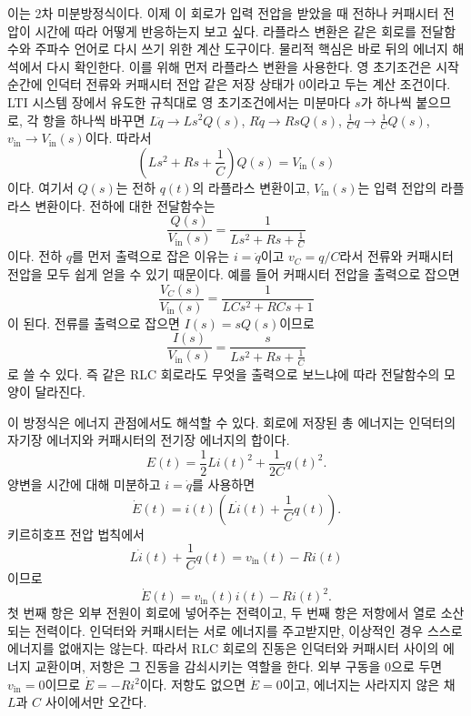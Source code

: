 이는 2차 미분방정식이다.
이제 이 회로가 입력 전압을 받았을 때 전하나 커패시터 전압이 시간에 따라 어떻게 반응하는지 보고 싶다.
라플라스 변환은 같은 회로를 전달함수와 주파수 언어로 다시 쓰기 위한 계산 도구이다.
물리적 핵심은 바로 뒤의 에너지 해석에서 다시 확인한다.
이를 위해 먼저 라플라스 변환을 사용한다.
영 초기조건은 시작 순간에 인덕터 전류와 커패시터 전압 같은 저장 상태가 0이라고 두는 계산 조건이다.
LTI 시스템 장에서 유도한 규칙대로 영 초기조건에서는 미분마다 $s$가 하나씩 붙으므로, 각 항을 하나씩 바꾸면 $L\ddot{q}\to Ls^2Q(s)$, $R\dot{q}\to RsQ(s)$, $\frac{1}{C}q\to\frac{1}{C}Q(s)$, $v_{\mathrm{in}}\to V_{\mathrm{in}}(s)$이다.
%
따라서
\begin{equation}
  \left(Ls^2 + Rs + \frac{1}{C}\right) Q(s) = V_{\mathrm{in}}(s)
\end{equation}
이다.
여기서 $Q(s)$는 전하 $q(t)$의 라플라스 변환이고, $V_{\mathrm{in}}(s)$는 입력 전압의 라플라스 변환이다.
전하에 대한 전달함수는
\begin{equation}
  \frac{Q(s)}{V_{\mathrm{in}}(s)}
  =
  \frac{1}{Ls^2 + Rs + \frac{1}{C}}
\end{equation}
이다.
전하 $q$를 먼저 출력으로 잡은 이유는 $i=\dot{q}$이고 $v_C=q/C$라서 전류와 커패시터 전압을 모두 쉽게 얻을 수 있기 때문이다.
예를 들어 커패시터 전압을 출력으로 잡으면
\begin{equation}
  \frac{V_C(s)}{V_{\mathrm{in}}(s)}
  =
  \frac{1}{LCs^2+RCs+1}
\end{equation}
이 된다.
전류를 출력으로 잡으면 $I(s)=sQ(s)$이므로
\begin{equation}
  \frac{I(s)}{V_{\mathrm{in}}(s)}
  =
  \frac{s}{Ls^2+Rs+\frac{1}{C}}
\end{equation}
로 쓸 수 있다.
즉 같은 RLC 회로라도 무엇을 출력으로 보느냐에 따라 전달함수의 모양이 달라진다.

이 방정식은 에너지 관점에서도 해석할 수 있다.
회로에 저장된 총 에너지는 인덕터의 자기장 에너지와 커패시터의 전기장 에너지의 합이다.
\begin{equation}
  E(t)
  =
  \frac{1}{2}L i(t)^2
  +
  \frac{1}{2C}q(t)^2.
\end{equation}
양변을 시간에 대해 미분하고 $i=\dot{q}$를 사용하면
\begin{equation}
  \dot{E}(t)
  =
  i(t)
  \left(
  L\dot{i}(t)+\frac{1}{C}q(t)
  \right).
\end{equation}
키르히호프 전압 법칙에서
\begin{equation}
  L\dot{i}(t)+\frac{1}{C}q(t)
  =
  v_{\mathrm{in}}(t)-Ri(t)
\end{equation}
이므로
\begin{equation}
  \dot{E}(t)
  =
  v_{\mathrm{in}}(t)i(t) - R i(t)^2.
\end{equation}
첫 번째 항은 외부 전원이 회로에 넣어주는 전력이고, 두 번째 항은 저항에서 열로 소산되는 전력이다.
인덕터와 커패시터는 서로 에너지를 주고받지만, 이상적인 경우 스스로 에너지를 없애지는 않는다.
따라서 RLC 회로의 진동은 인덕터와 커패시터 사이의 에너지 교환이며, 저항은 그 진동을 감쇠시키는 역할을 한다.
외부 구동을 0으로 두면 $v_{\mathrm{in}}=0$이므로 $\dot{E}=-Ri^2$이다.
저항도 없으면 $\dot{E}=0$이고, 에너지는 사라지지 않은 채 $L$과 $C$ 사이에서만 오간다.

